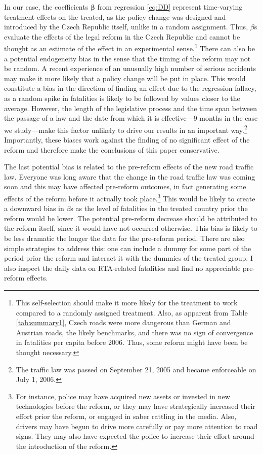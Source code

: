 \documentclass[12pt]{article}
\begin{document}
In our case, the coefficients $\boldsymbol{\beta}$ from regression \ref{eq:DD}
represent time-varying treatment effects on the treated, as the policy change
was designed and introduced by the Czech Republic itself, unlike in a random
assignment. Thus, $\beta$s evaluate the effects of the legal reform in the Czech
Republic and cannot be thought as an estimate of the effect in an experimental
sense.\footnote{This self-selection should make it more likely for the treatment
to work compared to a randomly assigned treatment.  Also, as apparent from
Table \ref{tab:summary1}, Czech roads were more dangerous than German and
Austrian roads, the likely benchmarks, and there was no sign of convergence in
fatalities per capita before 2006. Thus, some reform might have been be
thought necessary.} There can also be a potential endogeneity bias in the
sense that the timing of the reform may not be random. A recent experience of an
unusually high number of serious accidents may make it more likely that a policy
change will be put in place. This would constitute a bias in the direction of
finding an effect due to the regression fallacy, as a random spike in fatalities
is likely to be followed by values closer to the average. However, the length of
the legislative process and the time span between the passage of a law and the
date from which it is effective---9 months in the case we study---make this
factor unlikely to drive our results in an important way.\footnote{The traffic
  law was passed on September 21, 2005 and became enforceable on July 1, 2006.}
Importantly, these biases work against the finding of no significant effect of
the reform and therefore make the conclusions of this paper conservative. 

The last potential bias is related to the pre-reform effects of the new road
traffic law.  Everyone was long aware that the change in the road traffic law
was coming soon and this may have affected pre-reform outcomes, in fact
generating some effects of the reform before it actually took
place.\footnote{For instance, police may have acquired new assets or invested in
  new technologies before the reform, or they may have strategically increased
  their effort prior the reform, or engaged in saber rattling in the media.
  Also, drivers may have begun to drive more carefully or pay more attention to
  road signs. They may also have expected the police to increase their effort
  around the introduction of the reform.} This would be likely to create a
downward bias in $\beta$s as the level of fatalities in the treated country
prior the reform would be lower. The potential pre-reform decrease should be
attributed to the reform itself, since it would have not occurred otherwise.
This bias is likely to be less dramatic the longer the data for the pre-reform
period.  There are also simple strategies to address this: one can include a
dummy for some part of the period prior the reform and interact it with the
dummies of the treated group. I also inspect the daily data on RTA-related
fatalities and find no appreciable pre-reform effects.
\end{document}
